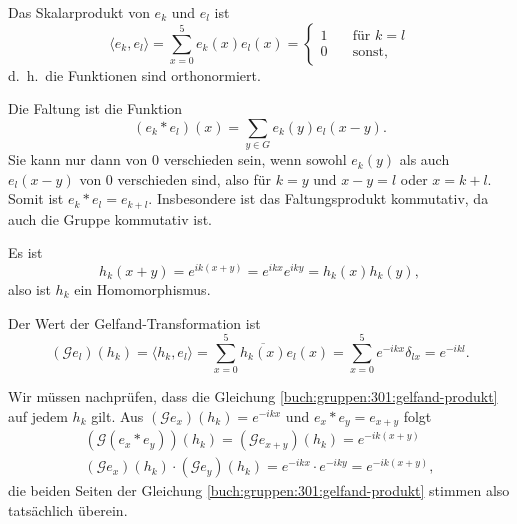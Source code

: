 \begin{loesung}
\begin{teilaufgaben}
\item
Das Skalarprodukt von $e_k$ und $e_l$ ist
\[
\langle e_k,e_l\rangle
=
\sum_{x=0}^5 e_k(x)e_l(x)
=
\begin{cases}
1&\quad\text{für $k=l$}\\
0&\quad\text{sonst,}
\end{cases}
\]
d.~h.~die Funktionen sind orthonormiert.
\item
Die Faltung ist die Funktion
\[
(e_k*e_l)(x)
=
\sum_{y\in G} e_k(y)e_l(x-y).
\]
Sie kann nur dann von $0$ verschieden sein, wenn sowohl 
$e_k(y)$ als auch $e_l(x-y)$ von $0$ verschieden sind, also
für $k=y$ und $x-y=l$ oder $x=k+l$.
Somit ist $e_k*e_l=e_{k+l}$.
Insbesondere ist das Faltungsprodukt kommutativ, da auch die
Gruppe kommutativ ist.
\item
Es ist
\[
h_k(x+y)=e^{ik(x+y)} = e^{ikx}e^{iky} = h_k(x)h_k(y),
\]
also ist $h_k$ ein Homomorphismus.
\item
Der Wert der Gelfand-Transformation ist
\[
(\mathscr{G}e_l)(h_k)
=
\langle h_k,e_l\rangle
=
\sum_{x=0}^5 \overline{h_k(x)} e_l(x)
=
\sum_{x=0}^5 e^{-ikx}\delta_{lx}
=
e^{-ikl}.
\]
\item
Wir müssen nachprüfen, dass die Gleichung
\eqref{buch:gruppen:301:gelfand-produkt}
auf jedem $h_k$ gilt.
Aus $(\mathscr{G}e_x)(h_k)=e^{-ikx}$ und
$e_x*e_y=e_{x+y}$
folgt
\begin{align*}
(\mathscr{G}(e_x*e_y))(h_k)
=
(\mathscr{G}e_{x+y})(h_k)
=e^{-ik(x+y)}
\\
(\mathscr{G}e_x)(h_k)
\cdot
(\mathscr{G}e_y)(h_k)
=
e^{-ikx}\cdot e^{-iky}
=
e^{-ik(x+y)},
\end{align*}
die beiden Seiten der Gleichung
\eqref{buch:gruppen:301:gelfand-produkt}
stimmen also tatsächlich überein.
\end{teilaufgaben}
\end{loesung}

